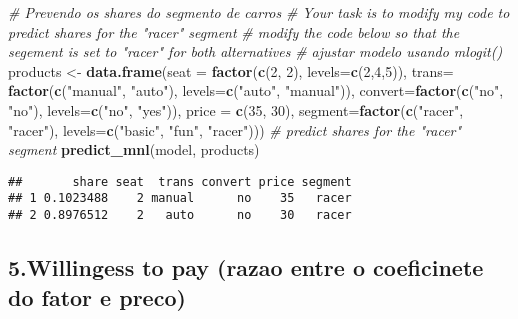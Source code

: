 \documentclass[]{article}
\newenvironment{Shaded}{\begin{snugshade}}{\end{snugshade}}
\newcommand{\CommentTok}[1]{\textcolor[rgb]{0.56,0.35,0.01}{\textit{#1}}}
\newcommand{\DataTypeTok}[1]{\textcolor[rgb]{0.13,0.29,0.53}{#1}}
\newcommand{\DecValTok}[1]{\textcolor[rgb]{0.00,0.00,0.81}{#1}}
\newcommand{\KeywordTok}[1]{\textcolor[rgb]{0.13,0.29,0.53}{\textbf{#1}}}
\newcommand{\NormalTok}[1]{#1}
\newcommand{\StringTok}[1]{\textcolor[rgb]{0.31,0.60,0.02}{#1}}
\begin{document}
\begin{Shaded}
\begin{Highlighting}[]
\CommentTok{# Prevendo os shares do segmento de carros}
\CommentTok{# Your task is to modify my code to predict shares for the "racer" segment}
\CommentTok{# modify the code below so that the segement is set to "racer" for both alternatives}
\CommentTok{# ajustar modelo usando mlogit() }
\NormalTok{products <-}\StringTok{ }\KeywordTok{data.frame}\NormalTok{(}\DataTypeTok{seat =} \KeywordTok{factor}\NormalTok{(}\KeywordTok{c}\NormalTok{(}\DecValTok{2}\NormalTok{, }\DecValTok{2}\NormalTok{), }\DataTypeTok{levels=}\KeywordTok{c}\NormalTok{(}\DecValTok{2}\NormalTok{,}\DecValTok{4}\NormalTok{,}\DecValTok{5}\NormalTok{)), }
                       \DataTypeTok{trans=} \KeywordTok{factor}\NormalTok{(}\KeywordTok{c}\NormalTok{(}\StringTok{"manual"}\NormalTok{, }\StringTok{"auto"}\NormalTok{), }
                                     \DataTypeTok{levels=}\KeywordTok{c}\NormalTok{(}\StringTok{"auto"}\NormalTok{, }\StringTok{"manual"}\NormalTok{)),}
                       \DataTypeTok{convert=}\KeywordTok{factor}\NormalTok{(}\KeywordTok{c}\NormalTok{(}\StringTok{"no"}\NormalTok{, }\StringTok{"no"}\NormalTok{), }
                                      \DataTypeTok{levels=}\KeywordTok{c}\NormalTok{(}\StringTok{"no"}\NormalTok{, }\StringTok{"yes"}\NormalTok{)), }
                       \DataTypeTok{price =} \KeywordTok{c}\NormalTok{(}\DecValTok{35}\NormalTok{, }\DecValTok{30}\NormalTok{), }
                       \DataTypeTok{segment=}\KeywordTok{factor}\NormalTok{(}\KeywordTok{c}\NormalTok{(}\StringTok{"racer"}\NormalTok{, }\StringTok{"racer"}\NormalTok{), }
                                      \DataTypeTok{levels=}\KeywordTok{c}\NormalTok{(}\StringTok{"basic"}\NormalTok{, }\StringTok{"fun"}\NormalTok{, }\StringTok{"racer"}\NormalTok{)))}
\CommentTok{# predict shares for the "racer" segment}
\KeywordTok{predict_mnl}\NormalTok{(model, products)}
\end{Highlighting}
\end{Shaded}

\begin{verbatim}
##       share seat  trans convert price segment
## 1 0.1023488    2 manual      no    35   racer
## 2 0.8976512    2   auto      no    30   racer
\end{verbatim}

\hypertarget{willingess-to-pay-razao-entre-o-coeficinete-do-fator-e-preco}{%
\subsection{5.Willingess to pay (razao entre o coeficinete do fator e
preco)}\label{willingess-to-pay-razao-entre-o-coeficinete-do-fator-e-preco}}
\end{document}
